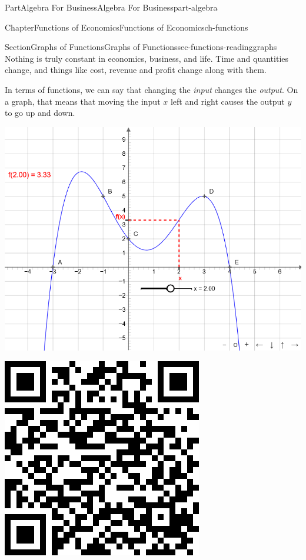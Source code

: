 \documentclass[oneside,10pt,]{tufte-book}
\numberwithin{equation}{chapter}
\begin{document}
\begin{partptx}{Part}{Algebra For Business}{}{Algebra For Business}{}{}{part-algebra}
\begin{chapterptx}{Chapter}{Functions of Economics}{}{Functions of Economics}{}{}{ch-functions}
\begin{sectionptx}{Section}{Graphs of Functions}{}{Graphs of Functions}{}{}{sec-functions-readinggraphs}
Nothing is truly constant in economics, business, and life. Time and quantities change, and things like cost, revenue and profit change along with them.%
\par
In terms of functions, we can say that changing the \emph{input}  changes the \emph{output}. On a graph, that means that moving the input \(x\) left and right causes the output \(y\) to go up and down.%
\begin{sidebyside}{2}{0.075}{0.075}{0.17}%
\begin{sbspanel}{0.47}%
\includegraphics[width=\linewidth]{external/jsxgraph-algebra-function-notation.png}
\end{sbspanel}%
\begin{sbspanel}{0.21}%
\includegraphics[width=\linewidth]{generated/qrcode/sec-functions-readinggraphs-4.png}

\end{sbspanel}
\end{sidebyside}
\end{sectionptx}
\end{chapterptx}
\end{partptx}
\end{document}
